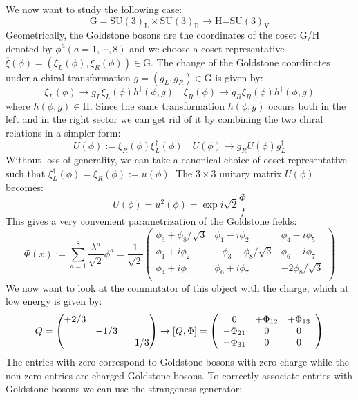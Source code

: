 \documentclass[../main.tex]{subfiles}
\begin{document}
We now want to study the following case:
\[
\text{G}=\text{SU}(3)_{\text{L}}\times\text{SU}(3)_{\text{R}}\to\text{H=SU}(3)_{\text{V}}
\]
Geometrically, the Goldstone bosons are the coordinates of the coset G/H denoted by $\phi^a(a=1,\cdots,8)$ 
and we choose a coset representative $\overline{\xi}(\phi)=(\xi_L(\phi),\xi_R(\phi))\in\text{G}$. The change of the Goldstone coordinates under a chiral transformation $g=(g_L,g_R)\in\text{G}$ is given by:
\[
\xi_L(\phi)\to g_L\xi_L(\phi)h^\dagger(\phi,g) \quad \xi_R(\phi)\to g_R\xi_R(\phi)h^\dagger(\phi,g)
\]
where $h(\phi,g)\in\text{H}$. Since the same transformation $h(\phi,g)$ occurs both in the left and in the right sector we can get rid of it by combining the two chiral relations in a simpler form:
\[
U(\phi):=\xi_R(\phi)\xi_L^\dagger(\phi) \quad U(\phi)\to g_RU(\phi)g_L^\dagger
\]
Without loss of generality, we can take a canonical choice of coset representative such that $\xi_L^\dagger(\phi)=\xi_R(\phi):=u(\phi)$. The $3\times3$ unitary matrix $U(\phi)$ becomes:
\[
U(\phi)=u^2(\phi)=\exp{i\sqrt{2}\frac{\Phi}{f}}
\]
This gives a very convenient parametrization of the Goldstone fields:
\[
\Phi(x):=\sum_{a=1}^8\frac{\lambda^a}{\sqrt{2}}\phi^a=\frac{1}{\sqrt{2}}\left(\begin{array}{ccc}
    \phi_3+\phi_8/\sqrt{3} & \phi_1-i\phi_2 & \phi_4-i\phi_5 \\
    \phi_1+i\phi_2 & -\phi_3-\phi_8/\sqrt{3} & \phi_6-i\phi_7 \\
    \phi_4+i\phi_5 & \phi_6+i\phi_7 & -2\phi_8/\sqrt{3} \\
\end{array}\right)
\]
We now want to look at the commutator of this object with the charge, which at low energy is given by:
\[
Q=\mqty(\dmat{+2/3,-1/3,-1/3})\to[Q,\Phi]=\left(\begin{array}{ccc}
    0 & +\Phi_{12} & +\Phi_{13} \\
    -\Phi_{21} & 0 & 0 \\
    -\Phi_{31} & 0 & 0
\end{array}\right)
\]
The entries with zero correspond to Goldstone bosons with zero charge while the non-zero entries are charged Goldstone bosons. To correctly associate entries with Goldstone bosons we can use the strangeness generator:
\end{document}
